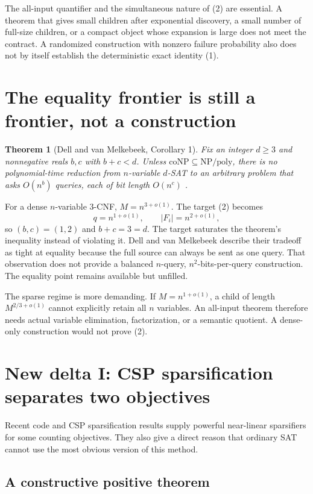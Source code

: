 \documentclass[11pt]{article}
\newtheorem{theorem}{Theorem}
\begin{document}
The all-input quantifier and the simultaneous nature of (2) are essential.
A theorem that gives small children after exponential discovery, a small
number of full-size children, or a compact object whose expansion is large
does not meet the contract.  A randomized construction with nonzero failure
probability also does not by itself establish the deterministic exact
identity (1).

\section{The equality frontier is still a frontier, not a construction}

\begin{theorem}[Dell and van Melkebeek, Corollary 1]\label{thm:dvm}
Fix an integer $d\ge3$ and nonnegative reals $b,c$ with $b+c<d$.  Unless
$\mathrm{coNP}\subseteq\mathrm{NP/poly}$, there is no polynomial-time
reduction from $n$-variable $d$-SAT to an arbitrary problem that asks
$O(n^b)$ queries, each of bit length $O(n^c)$
\cite{dellvanmelkebeek2014}.
\end{theorem}

For a dense $n$-variable $3$-CNF, $M=n^{3+o(1)}$.  The target (2) becomes
\[
 q=n^{1+o(1)},\qquad |F_i|=n^{2+o(1)},
\]
so $(b,c)=(1,2)$ and $b+c=3=d$.  The target saturates the theorem's
inequality instead of violating it.  Dell and van Melkebeek describe their
tradeoff as tight at equality because the full source can always be sent as
one query.  That observation does not provide a balanced $n$-query,
$n^2$-bits-per-query construction.  The equality point remains available
but unfilled.

The sparse regime is more demanding.  If $M=n^{1+o(1)}$, a child of length
$M^{2/3+o(1)}$ cannot explicitly retain all $n$ variables.  An all-input
theorem therefore needs actual variable elimination, factorization, or a
semantic quotient.  A dense-only construction would not prove (2).

\section{New delta I: CSP sparsification separates two objectives}

Recent code and CSP sparsification results supply powerful near-linear
sparsifiers for some counting objectives.  They also give a direct reason
that ordinary SAT cannot use the most obvious version of this method.

\subsection{A constructive positive theorem}
\end{document}
